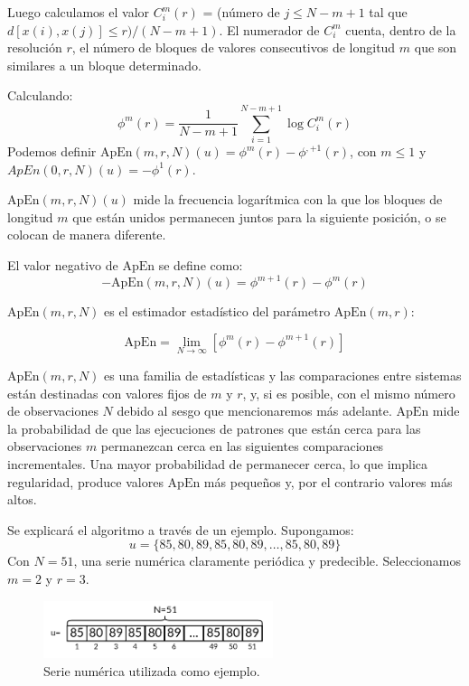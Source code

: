 \documentclass[a4paper,12pt]{article}
\begin{document}
Luego calculamos el valor $C_i^m (r)$ = (número de $j \leq N - m + 1$ tal que $d[x(i), x(j)] \leq r)/(N - m + 1)$. El numerador de $C_i^m$ cuenta, dentro de la resolución $r$, el número de bloques de valores consecutivos de longitud $m$ que son similares a un bloque determinado. 

Calculando: 
\begin{equation}\label{eqn:apen_1}
	\phi^m(r) = \frac{1}{N-m+1} \sum_{i=1}^{N-m+1} \log C_i^m(r)
\end{equation}
Podemos definir $\textrm{ApEn}(m, r, N )(u) = \phi^m(r) - \phi^{,+1}(r)$, con $m \leq 1$ y $ApEn(0, r, N )(u) = −\phi^1 (r)$. 

$\textrm{ApEn}(m, r, N )(u)$ mide la frecuencia logarítmica con la que los bloques de longitud $m$ que están unidos permanecen juntos para la siguiente posición, o se colocan de manera diferente.

El valor negativo de $\textrm{ApEn}$ se define como:
\begin{equation}\label{eqn:apen_2}
	-\textrm{ApEn}(m, r, N )(u) = \phi^{m+1}(r) - \phi^m(r)
\end{equation}

$\textrm{ApEn}(m,r,N)$ es el estimador estadístico del parámetro $\textrm{ApEn}(m,r)$:

\begin{equation}\label{eqn:apen_3}
	\textrm{ApEn} = \lim_{N\to\infty} [\phi^m(r)-\phi^{m+1}(r)]
\end{equation}

$\textrm{ApEn}(m, r, N)$ es una familia de estadísticas y las comparaciones entre sistemas están destinadas con valores fijos de $m$ y $r$, y, si es posible, con el mismo número de observaciones $N$ debido al sesgo que mencionaremos más adelante. $\textrm{ApEn}$ mide la probabilidad de que las ejecuciones de patrones que están cerca para las observaciones $m$ permanezcan cerca en las siguientes comparaciones incrementales. Una mayor probabilidad de permanecer cerca, lo que implica regularidad, produce valores $\textrm{ApEn}$ más pequeños y, por el contrario valores más altos.

Se explicará el algoritmo a través de un ejemplo.
Supongamos: 
$$u = \{85, 80, 89, 85, 80, 89, \dots, 85, 80, 89\}$$
Con $N=51$, una serie numérica claramente periódica y predecible. Seleccionamos $m=2$ y $r=3$.

\begin{figure}[H]
	\begin{center}
		\includegraphics[width=0.6\textwidth]{apen_1.png}
		\caption{Serie numérica utilizada como ejemplo.}
		\label{fig:apen_1}
	\end{center}
\end{figure}
\end{document}
